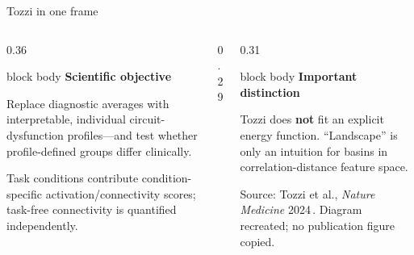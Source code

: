\documentclass[aspectratio=169,10pt]{beamer}
\begin{document}
\begin{frame}{Tozzi in one frame}
\vspace{0.28cm}
\begin{columns}[T,onlytextwidth]
  \begin{column}{0.36\textwidth}
    \begin{beamercolorbox}[rounded=true,sep=.22cm]{block body}
      {\color{Navy}\small\bfseries Scientific objective}\par\vspace{.08cm}
      \scriptsize Replace diagnostic averages with interpretable, individual circuit-dysfunction profiles—and test whether profile-defined groups differ clinically.
    \end{beamercolorbox}
    \vspace{.18cm}
    {\color{Muted}\tiny Task conditions contribute condition-specific activation/connectivity scores; task-free connectivity is quantified independently.}
  \end{column}
  \begin{column}{0.29\textwidth}
  \end{column}
  \begin{column}{0.31\textwidth}
    \begin{beamercolorbox}[rounded=true,sep=.22cm]{block body}
      {\color{Red}\scriptsize\bfseries Important distinction}\par\vspace{.08cm}
      \scriptsize Tozzi does \textbf{not} fit an explicit energy function. “Landscape” is only an intuition for basins in correlation-distance feature space.
    \end{beamercolorbox}
    \vspace{.20cm}
    {\color{Muted}\tiny Source: Tozzi et al., \textit{Nature Medicine} 2024\,\cite{tozzi2024}. Diagram recreated; no publication figure copied.}
  \end{column}
\end{columns}
\end{frame}
\end{document}
